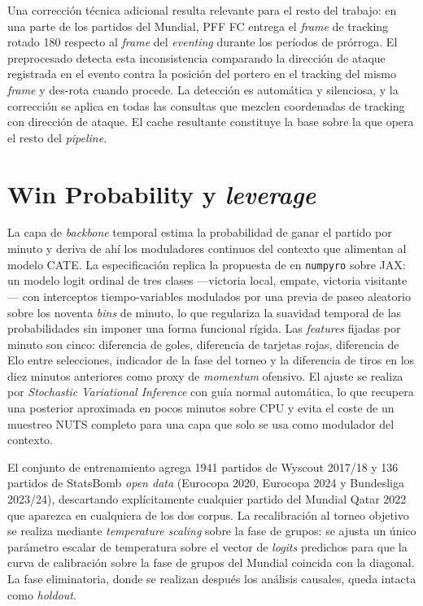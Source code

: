 Una corrección técnica adicional resulta relevante para el resto del
trabajo: en una parte de los partidos del Mundial, PFF FC entrega el
\textit{frame} de tracking rotado 180\textdegree{} respecto al
\textit{frame} del \textit{eventing} durante los períodos de prórroga.
El preprocesado detecta esta inconsistencia comparando la dirección
de ataque registrada en el evento contra la posición del portero en
el tracking del mismo \textit{frame} y des-rota cuando procede. La
detección es automática y silenciosa, y la corrección se aplica en
todas las consultas que mezclen coordenadas de tracking con dirección
de ataque. El cache resultante constituye la base sobre la que opera
el resto del \textit{pipeline}.


\section{Win Probability y \textit{leverage}}
\label{sec:wp-leverage}

La capa de \textit{backbone} temporal estima la probabilidad de ganar
el partido por minuto y deriva de ahí los moduladores continuos del
contexto que alimentan al modelo CATE. La especificación replica la
propuesta de \textcite{Robberechts2021WP} en \texttt{numpyro} sobre
JAX: un modelo logit ordinal de tres clases ---victoria local, empate,
victoria visitante--- con interceptos tiempo-variables modulados por
una previa de paseo aleatorio sobre los noventa \textit{bins} de
minuto, lo que regulariza la suavidad temporal de las probabilidades
sin imponer una forma funcional rígida. Las \textit{features} fijadas
por minuto son cinco: diferencia de goles, diferencia de tarjetas
rojas, diferencia de Elo entre selecciones, indicador de la fase del
torneo y la diferencia de tiros en los diez minutos anteriores como
proxy de \textit{momentum} ofensivo. El ajuste se realiza por
\textit{Stochastic Variational Inference} con guía normal automática,
lo que recupera una posterior aproximada en pocos minutos sobre CPU
y evita el coste de un muestreo NUTS completo para una capa que solo
se usa como modulador del contexto.

El conjunto de entrenamiento agrega 1941 partidos de Wyscout 2017/18
y 136 partidos de StatsBomb \textit{open data} (Eurocopa 2020,
Eurocopa 2024 y Bundesliga 2023/24), descartando explícitamente
cualquier partido del Mundial Qatar 2022 que aparezca en cualquiera
de los dos corpus. La recalibración al torneo objetivo se realiza
mediante \textit{temperature scaling} sobre la fase de grupos: se
ajusta un único parámetro escalar de temperatura sobre el vector de
\textit{logits} predichos para que la curva de calibración sobre la
fase de grupos del Mundial coincida con la diagonal. La fase
eliminatoria, donde se realizan después los análisis causales, queda
intacta como \textit{holdout}.

